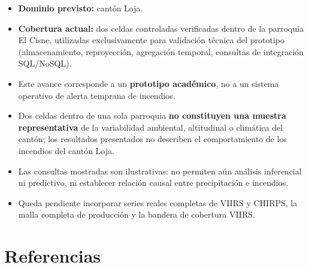 \documentclass[11pt,a4paper]{article}
\begin{document}
\begin{itemize}
    \item \textbf{Dominio previsto:} cant\'on Loja.
    \item \textbf{Cobertura actual:} dos celdas controladas verificadas dentro de la parroquia El Cisne, utilizadas exclusivamente para validaci\'on t\'ecnica del prototipo (almacenamiento, reproyecci\'on, agregaci\'on temporal, consultas de integraci\'on SQL/NoSQL).
    \item Este avance corresponde a un \textbf{prototipo acad\'emico}, no a un sistema operativo de alerta temprana de incendios.
    \item Dos celdas dentro de una sola parroquia \textbf{no constituyen una muestra representativa} de la variabilidad ambiental, altitudinal o clim\'atica del cant\'on; los resultados presentados no describen el comportamiento de los incendios del cant\'on Loja.
    \item Las consultas mostradas son ilustrativas: no permiten a\'un an\'alisis inferencial ni predictivo, ni establecer relaci\'on causal entre precipitaci\'on e incendios.
    \item Queda pendiente incorporar series reales completas de VIIRS y CHIRPS, la malla completa de producci\'on y la bandera de cobertura VIIRS.
\end{itemize}

\section{Referencias}
\end{document}
